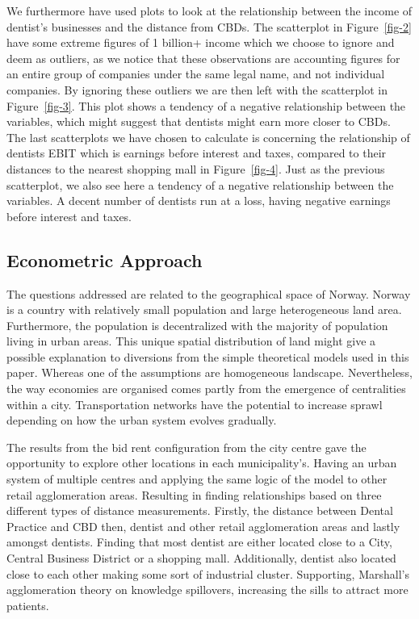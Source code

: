 \documentclass[
  10,
  a4paper,
]{article}
\begin{document}
We furthermore have used plots to look at the relationship between the
income of dentist's businesses and the distance from CBDs. The
scatterplot in Figure~\ref{fig-2} have some extreme figures of 1
billion+ income which we choose to ignore and deem as outliers, as we
notice that these observations are accounting figures for an entire
group of companies under the same legal name, and not individual
companies. By ignoring these outliers we are then left with the
scatterplot in Figure~\ref{fig-3}. This plot shows a tendency of a
negative relationship between the variables, which might suggest that
dentists might earn more closer to CBDs. The last scatterplots we have
chosen to calculate is concerning the relationship of dentists EBIT
which is earnings before interest and taxes, compared to their distances
to the nearest shopping mall in Figure~\ref{fig-4}. Just as the previous
scatterplot, we also see here a tendency of a negative relationship
between the variables. A decent number of dentists run at a loss, having
negative earnings before interest and taxes.

\hypertarget{econometric-approach}{%
\subsection{\texorpdfstring{\textbf{Econometric
Approach}}{Econometric Approach}}\label{econometric-approach}}

The questions addressed are related to the geographical space of Norway.
Norway is a country with relatively small population and large
heterogeneous land area. Furthermore, the population is decentralized
with the majority of population living in urban areas. This unique
spatial distribution of land might give a possible explanation to
diversions from the simple theoretical models used in this paper.
Whereas one of the assumptions are homogeneous landscape. Nevertheless,
the way economies are organised comes partly from the emergence of
centralities within a city. Transportation networks have the potential
to increase sprawl depending on how the urban system evolves gradually.

The results from the bid rent configuration from the city centre gave
the opportunity to explore other locations in each municipality's.
Having an urban system of multiple centres and applying the same logic
of the model to other retail agglomeration areas. Resulting in finding
relationships based on three different types of distance measurements.
Firstly, the distance between Dental Practice and CBD then, dentist and
other retail agglomeration areas and lastly amongst dentists. Finding
that most dentist are either located close to a City, Central Business
District or a shopping mall. Additionally, dentist also located close to
each other making some sort of industrial cluster. Supporting,
Marshall's agglomeration theory on knowledge spillovers, increasing the
sills to attract more patients.
\end{document}
